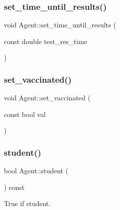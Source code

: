 \mbox{\label{classAgent_a8f56c1c255e7bb89da56a694942ba863}} 
\subsubsection{\texorpdfstring{set\+\_\+time\+\_\+until\+\_\+results()}{set\_time\_until\_results()}}
{\footnotesize\ttfamily void Agent\+::set\+\_\+time\+\_\+until\+\_\+results (\begin{DoxyParamCaption}\item[{const double}]{test\+\_\+res\+\_\+time }\end{DoxyParamCaption})\hspace{0.3cm}{\ttfamily [inline]}}

\mbox{\label{classAgent_adcdd68040573001d599a3163cafb6f3f}} 
\subsubsection{\texorpdfstring{set\+\_\+vaccinated()}{set\_vaccinated()}}
{\footnotesize\ttfamily void Agent\+::set\+\_\+vaccinated (\begin{DoxyParamCaption}\item[{const bool}]{val }\end{DoxyParamCaption})\hspace{0.3cm}{\ttfamily [inline]}}

\mbox{\label{classAgent_aaafd3f91e823471cdfdcf4c31cdebd7d}} 
\subsubsection{\texorpdfstring{student()}{student()}}
{\footnotesize\ttfamily bool Agent\+::student (\begin{DoxyParamCaption}{ }\end{DoxyParamCaption}) const\hspace{0.3cm}{\ttfamily [inline]}}



True if student. 

